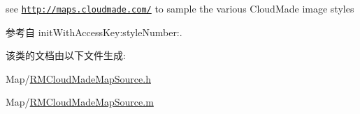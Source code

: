 see \href{http://maps.cloudmade.com/}{\tt http\-://maps.\-cloudmade.\-com/} to sample the various Cloud\-Made image styles 



参考自 init\-With\-Access\-Key\-:style\-Number\-:.



该类的文档由以下文件生成\-:\begin{DoxyCompactItemize}
\item 
Map/\hyperlink{_r_m_cloud_made_map_source_8h}{R\-M\-Cloud\-Made\-Map\-Source.\-h}\item 
Map/\hyperlink{_r_m_cloud_made_map_source_8m}{R\-M\-Cloud\-Made\-Map\-Source.\-m}\end{DoxyCompactItemize}
